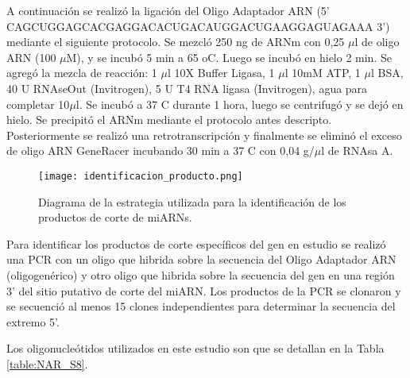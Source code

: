 A continuación se realizó la ligación del Oligo Adaptador ARN (5' CAGCUGGAGCACGAGGACACUGACAUGGACUGAAGGAGUAGAAA 3') mediante el siguiente protocolo.
Se mezcló 250 ng de ARNm con 0,25 $\mu$l de oligo ARN (100 $\mu$M), y se incubó 5 min a 65 oC. Luego se incubó en hielo 2 min.
Se agregó la mezcla de reacción: 1 $\mu$l 10X Buffer Ligasa, 1 $\mu$l 10mM ATP, 1 $\mu$l BSA, 40 U RNAseOut (Invitrogen), 5 U T4 RNA ligasa (Invitrogen), agua para completar 10$\mu$l.
Se incubó a 37 \degree  C durante 1 hora, luego se centrifugó y se dejó en hielo. 
Se precipitó el ARNm mediante el protocolo antes descripto.
Posteriormente se realizó una retrotranscripción y finalmente se eliminó el exceso de oligo ARN GeneRacer incubando 30 min a 37 \degree C con 0,04 g/$\mu$l de RNAsa A.

\begin{figure}[htbp!] 
    \centering    
    \texttt{[image: identificacion\_producto.png]}
    \caption[Diagrama de la estrategia utilizada para la identificación de los productos de corte de miARNs]{
        Diagrama de la estrategia utilizada para la identificación de los productos de corte de miARNs.
    }
    \label{fig:identificacion_producto}
\end{figure}

Para identificar los productos de corte específicos del gen en estudio se realizó una PCR con un oligo que hibrida sobre la secuencia del Oligo Adaptador ARN (oligogenérico) y otro oligo que hibrida sobre la secuencia del gen en una región 3' del sitio putativo de corte del miARN.
Los productos de la PCR se clonaron y se secuenció al menos 15 clones independientes para determinar la secuencia del extremo 5'.

Los oligonucleótidos utilizados en este estudio son que se detallan en la Tabla \ref{table:NAR_S8}.

